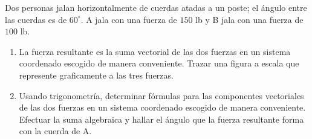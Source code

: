 Dos personas jalan horizontalmente de cuerdas atadas a un poste; el ángulo entre las cuerdas es de $60^\circ$. A jala con una fuerza de $150$ lb y B jala con una fuerza de $100$ lb.
\begin{enumerate}
    \item La fuerza resultante es la suma vectorial de las dos fuerzas en un sistema coordenado escogido de manera conveniente. Trazar una figura a escala que represente graficamente a las tres fuerzas.
    \item Usando trigonometría, determinar fórmulas para las componentes vectoriales de las dos fuerzas en un sistema coordenado escogido de manera conveniente. Efectuar la suma algebraica y hallar el ángulo que la fuerza resultante forma con la cuerda de A.
\end{enumerate}